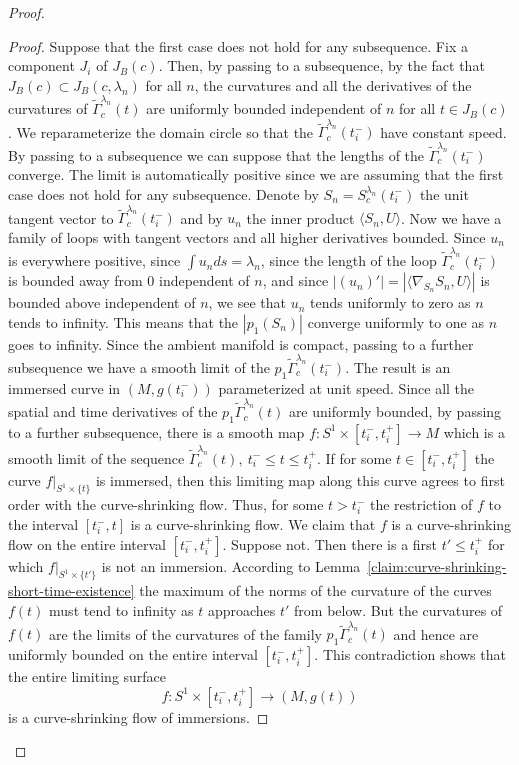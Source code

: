 \begin{proof}
\begin{proof}
Suppose that the first case does not hold for any subsequence. Fix a
component $J_i$ of $J_B(c)$. Then, by passing to a subsequence, by
the fact that $J_B(c)\subset J_B(c,\lambda_n)$ for all $n$, the
curvatures and all the derivatives of the curvatures of
$\widetilde\Gamma_c^{\lambda_n}(t)$ are uniformly bounded
independent of $n$ for all $t\in J_B(c)$. We reparameterize the
domain circle so that the $\widetilde\Gamma_c^{\lambda_n}(t_i^-)$
have constant speed. By passing to a subsequence we can suppose that
the lengths of the $\widetilde\Gamma_c^{\lambda_n}(t_i^-)$ converge.
The limit is automatically positive since we are assuming that the
first case does not hold for any subsequence. Denote by
$S_n=S_c^{\lambda_n}(t_i^-)$ the unit tangent vector to $\widetilde
\Gamma_c^{\lambda_n}(t_i^-)$ and by $u_n$ the inner product $\langle
S_n,U\rangle$. Now we have a family of loops with tangent vectors
and all higher derivatives bounded. Since $u_n$ is everywhere
positive, since $\int u_nds=\lambda_n$, since the length of the loop
$\widetilde \Gamma_c^{\lambda_n}(t_i^-)$ is bounded away from $0$
independent of $n$, and since
$|(u_n)'|=|\langle\nabla_{S_n}S_n,U\rangle|$ is bounded above
independent of $n$, we see that $u_n$ tends uniformly to zero as $n$
tends to infinity. This means that the $|p_1(S_n)|$ converge
uniformly to one as $n$ goes to infinity.
 Since
the ambient manifold is compact, passing to a further subsequence we
have a smooth limit of the
$p_1\widetilde\Gamma_c^{\lambda_n}(t_i^-)$. The result is an
immersed curve in $(M,g(t_i^-))$ parameterized at unit speed. Since
all the spatial and time derivatives of the $p_1\widetilde
\Gamma_c^{\lambda_n}(t)$ are uniformly bounded, by passing to a
further subsequence, there is a  smooth map $f\colon S^1\times
[t_i^-,t_i^+]\to M$ which is a smooth limit of the sequence
$\widetilde\Gamma_c^{\lambda_n}(t),\ t_i^-\le t\le t_i^+$. If for
some $t\in [t_i^-,t_i^+]$ the curve $f|_{S^1\times\{t\}}$ is
immersed, then this limiting map along this curve agrees to first
order with the curve-shrinking flow. Thus, for some $t>t_i^-$ the
restriction of $f$ to the interval $[t_i^-,t]$ is a curve-shrinking
flow. We claim that $f$ is a curve-shrinking flow on the entire
interval $[t_i^-,t_i^+]$. Suppose not. Then there is a first $t'\le
t_i^+$ for which $f|_{S^1\times \{t'\}}$ is not an immersion.
According to Lemma~\ref{claim:curve-shrinking-short-time-existence} the maximum of the norms of
the curvature of the curves $f(t)$ must tend to infinity as $t$
approaches $t'$ from below. But the curvatures of $f(t)$ are the
limits of the curvatures of the family $p_1\widetilde
\Gamma_c^{\lambda_n}(t)$ and hence are uniformly bounded on the
entire interval $[t_i^-,t_i^+]$.
 This contradiction shows that the
entire limiting surface
$$f\colon S^1\times [t_i^-,t_i^+]\to (M,g(t))$$
is a curve-shrinking flow of immersions.
\end{proof}


\end{proof}
